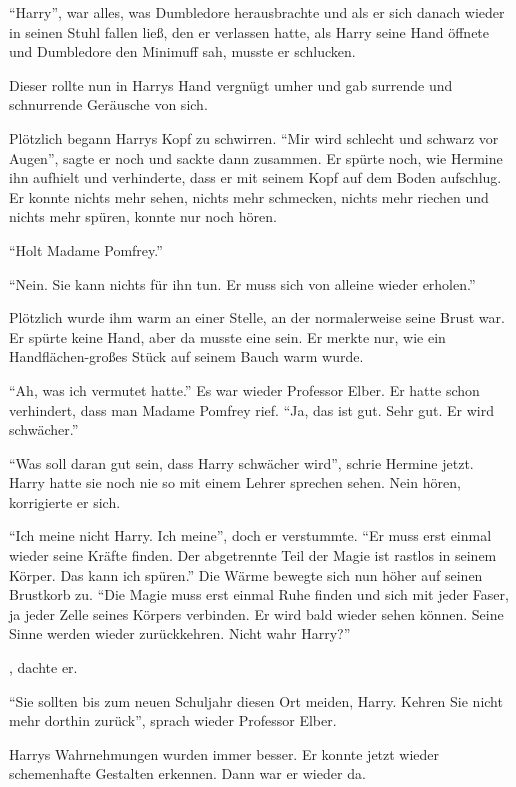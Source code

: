 \enquote{Harry}, war alles, was Dumbledore herausbrachte und als er sich danach wieder in seinen Stuhl fallen ließ, den er verlassen hatte, als Harry seine Hand öffnete und Dumbledore den Minimuff sah, musste er schlucken.

Dieser rollte nun in Harrys Hand vergnügt umher und gab surrende und schnurrende Geräusche von sich.

Plötzlich begann Harrys Kopf zu schwirren. \enquote{Mir wird schlecht und schwarz vor Augen}, sagte er noch und sackte dann zusammen. Er spürte noch, wie Hermine ihn aufhielt und verhinderte, dass er mit seinem Kopf auf dem Boden aufschlug. Er konnte nichts mehr sehen, nichts mehr schmecken, nichts mehr riechen und nichts mehr spüren, konnte nur noch hören.

\enquote{Holt Madame Pomfrey.}

\enquote{Nein. Sie kann nichts für ihn tun. Er muss sich von alleine wieder erholen.}

Plötzlich wurde ihm warm an einer Stelle, an der normalerweise seine Brust war. Er spürte keine Hand, aber da musste eine sein. Er merkte nur, wie ein Handflächen-großes Stück auf seinem Bauch warm wurde.

\enquote{Ah, was ich vermutet hatte.} Es war wieder Professor Elber. Er hatte schon verhindert, dass man Madame Pomfrey rief. \enquote{Ja, das ist gut. Sehr gut. Er wird schwächer.}

\enquote{Was soll daran gut sein, dass Harry schwächer wird}, schrie Hermine jetzt. Harry hatte sie noch nie so mit einem Lehrer sprechen sehen. Nein hören, korrigierte er sich.

\enquote{Ich meine nicht Harry. Ich meine\abs}, doch er verstummte. \enquote{Er muss erst einmal wieder seine Kräfte finden. Der abgetrennte Teil der Magie ist rastlos in seinem Körper. Das kann ich spüren.} Die Wärme bewegte sich nun höher auf seinen Brustkorb zu. \enquote{Die Magie muss erst einmal Ruhe finden und sich mit jeder Faser, ja jeder Zelle seines Körpers verbinden. Er wird bald wieder sehen können. Seine Sinne werden wieder zurückkehren. Nicht wahr Harry?}

, dachte er. 

\enquote{Sie sollten bis zum neuen Schuljahr diesen Ort meiden, Harry. Kehren Sie nicht mehr dorthin zurück}, sprach wieder Professor Elber.

Harrys Wahrnehmungen wurden immer besser. Er konnte jetzt wieder schemenhafte Gestalten erkennen. Dann \gst war er wieder da.


